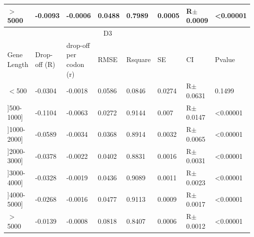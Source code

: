 \documentclass[a4,center,fleqn]{NAR}
\begin{document}
\begin{table}[t]
{\begin{tabular} {|l|l|l|l|l|l|l|l|}
\hline
$>$5000&-0.0093 &-0.0006 &0.0488 & 0.7989 & 0.0005 &R$\pm$0.0009&\textless 0.00001  \\
\hline
\multicolumn{7}{|c|}{D3} \\
\hline
Gene Length&Drop-off (R) & drop-off per codon (r)&RMSE& Rsquare &SE&CI &Pvalue\\
\hline
$<$500&-0.0304&-0.0018&0.0586&0.0846&0.0274&R$\pm$0.0631&0.1499 \\
\hline
]500-1000]&-0.1104&-0.0063&0.0272&0.9144&0.007&R$\pm$0.0147&\textless 0.00001 \\
\hline
]1000-2000]&-0.0589&-0.0034&0.0368&0.8914&0.0032&R$\pm$0.0065&\textless 0.00001 \\
\hline
]2000-3000]&-0.0378&-0.0022&0.0402&0.8831&0.0016&R$\pm$0.0031&\textless 0.00001 \\
\hline
]3000-4000]&-0.0328&-0.0019&0.0436&0.9089&0.0011&R$\pm$0.0023&\textless 0.00001 \\
\hline
]4000-5000]&-0.0268&-0.0016&0.0477&0.9113&0.0009&R$\pm$0.0017&\textless 0.00001 \\
\hline
$>$5000&-0.0139&-0.0008&0.0818&0.8407&0.0006&R$\pm$0.0012&\textless 0.00001 \\
\hline
\end{tabular}%
}

\end{table}
\end{document}
